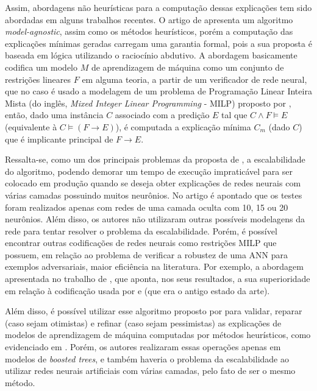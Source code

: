 Assim, abordagens não heurísticas para a computação dessas explicações tem sido abordadas em alguns trabalhos recentes. O artigo de  apresenta  um algoritmo \textit{model-agnostic}, assim como os métodos heurísticos, porém a computação das explicações mínimas geradas carregam uma garantia formal, pois a sua proposta é baseada em lógica utilizando o raciocínio abdutivo. A abordagem basicamente codifica um modelo $M$ de aprendizagem de máquina como um conjunto de restrições lineares $F$ em alguma teoria, a partir de um verificador de rede neural, que no caso é usado a modelagem de um problema de Programação Linear Inteira Mista (do inglês, \textit{Mixed Integer Linear Programming} - MILP) proposto por , então, dado uma instância $C$ associado com a predição $E$ tal que $C \wedge F \models E$ (equivalente à $C \models (F \rightarrow E)$), é computada a explicação mínima $C_m$ (dado $C$) que é implicante principal de  $F \rightarrow E$.

Ressalta-se, como um dos principais problemas da proposta de , a escalabilidade do algoritmo, podendo demorar um tempo de execução impraticável para ser colocado em produção quando se deseja obter explicações de redes neurais com várias camadas possuindo muitos neurônios. No artigo é apontado que os testes foram realizados apenas com redes de uma camada oculta com 10, 15 ou 20 neurônios. Além disso, os autores não utilizaram outras possíveis modelagens da rede para tentar resolver o problema da escalabilidade. Porém, é possível encontrar outras codificações de redes neurais como restrições MILP que possuem, em relação ao problema de verificar a robustez de uma ANN para exemplos adversariais, maior eficiência na literatura. Por exemplo, a abordagem apresentada no trabalho de , que aponta, nos seus resultados, a sua superioridade em relação à codificação usada por  e  (que era o antigo estado da arte). 

Além disso, é possível utilizar esse algoritmo proposto por  para validar, reparar (caso sejam otimistas) e refinar (caso sejam pessimistas) as explicações de modelos de aprendizagem de máquina computadas por métodos heurísticos, como evidenciado em . Porém, os autores realizaram essas operações apenas em modelos de \textit{boosted trees}, e também haveria o problema da escalabilidade ao utilizar redes neurais artificiais com várias camadas, pelo fato de ser o mesmo método. 

